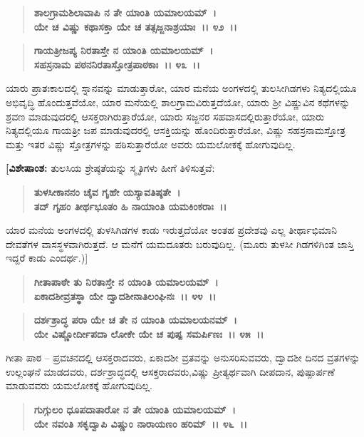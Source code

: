 \begin{verse}
\textbf{ಶಾಲಗ್ರಾಮಶಿಲಾವಾಪಿ ನ ತೇ ಯಾಂತಿ ಯಮಾಲಯಮ್~।}\\\textbf{ಯೇ ಚ ವಿಷ್ಣು ಕಥಾಸಕ್ತಾ ಯೇ ಚ ತತ್ಸಜ್ಜನಾಶ್ರಯಾಃ~।। ೪೨~।।}
\end{verse}

\begin{verse}
\textbf{ಗಾಯತ್ರೀಜಪ್ಯ ನಿರತಾಸ್ತೇ ನ ಯಾಂತಿ ಯಮಾಲಯಮ್~।}\\\textbf{ಸಹಸ್ರನಾಮ ಪಠನನಿರತಾಸ್ತೋತ್ರಪಾಠಕಾಃ~।। ೪೩~।।}
\end{verse}

ಯಾರು ಪ್ರಾತಃಕಾಲದಲ್ಲಿ ಸ್ನಾನವನ್ನು ಮಾಡುತ್ತಾರೋ, ಯಾರ ಮನೆಯ ಅಂಗಳದಲ್ಲಿ ತುಲಸೀಗಿಡಗಳು ನಿತ್ಯದಲ್ಲಿಯೂ ಅಭಿವೃದ್ಧಿ ಹೊಂದುತ್ತವೆಯೋ, ಯಾರ ಮನೆಯಲ್ಲಿ ಶಾಲಗ್ರಾಮವಿರುತ್ತದೆಯೋ, ಯಾರು ಶ‍್ರೀ ವಿಷ್ಣುವಿನ ಕಥೆಗಳನ್ನು ಶ್ರವಣ ಮಾಡುವುದರಲ್ಲಿ ಆಸಕ್ತರಾಗಿರುತ್ತಾರೆಯೋ, ಯಾರು ಸಜ್ಜನರ ಸಹವಾಸದಲ್ಲಿರುತ್ತಾರೆಯೋ, ಯಾರು ನಿತ್ಯದಲ್ಲಿಯೂ ಗಾಯತ್ರೀ ಜಪ ಮಾಡುವುದರಲ್ಲಿ ಆಸಕ್ತಿಯನ್ನು ಹೊಂದಿರುತ್ತಾರೆಯೋ, ವಿಷ್ಣು ಸಹಸ್ರನಾಮಸ್ತೋತ್ರ ಮತ್ತು ಇತರ ವಿಷ್ಣು ಸ್ತೋತ್ರಗಳನ್ನು ಪಠಿಸುತ್ತಾರೆಯೋ ಅವರು ಯಮಲೋಕಕ್ಕೆ ಹೋಗುವುದಿಲ್ಲ.

\textbf{[ವಿಶೇಷಾಂಶ:} ತುಲಸಿಯ ಶ್ರೇಷ್ಠತೆಯನ್ನು ಸ್ಮೃತಿಗಳು ಹೀಗೆ ತಿಳಿಸುತ್ತವೆ:

\begin{verse}
\textbf{ತುಳಸೀಕಾನನಂ ಚೈವ ಗೃಹೇ ಯಸ್ಯಾವತಿಷ್ಠತೇ~।}\\\textbf{ತದ್ ಗೃಹಂ ತೀರ್ಥಭೂತಂ ಹಿ ನಾಯಾಂತಿ ಯಮಕಿಂಕರಾಃ~।।}
\end{verse}

ಯಾರ ಮನೆಯ ಅಂಗಳದಲ್ಲಿ ತುಳಸಿಗಿಡಗಳ ಕಾಡು ಇರುತ್ತದೆಯೋ ಅಂತಹ ಪ್ರದೇಶವು ಎಲ್ಲ ತೀರ್ಥಾಭಿಮಾನಿ ದೇವತೆಗಳ ವಾಸಸ್ಥಳವಾಗಿರುತ್ತದೆ. ಆ ಮನೆಗೆ ಯಮದೂತರು ಬರುವುದಿಲ್ಲ. (ಮೂರು ತುಳಸೀ ಗಿಡಗಳಿಗಿಂತ ಜಾಸ್ತಿ ಇದ್ದರೆ ಕಾಡು ಎಂದರ್ಥ.)]

\begin{verse}
\textbf{ಗೀತಾಪಾಠೇ ತು ನಿರತಾಸ್ತೇ ನ ಯಾಂತಿ ಯಮಾಲಯಮ್~।}\\\textbf{ಏಕಾದಶೀವ್ರತಸ್ಥಾ ಯೇ ದ್ವಾದಶೀನಾತಿಲಂಘಿನಃ~।। ೪೪~।।} 
\end{verse}

\begin{verse}
\textbf{ದರ್ಶಶ್ರಾದ್ಧ ಪರಾ ಯೇ ಚ ತೇ ನ ಯಾಂತಿ ಯಮಾಲಯನಮ್~।}\\\textbf{ಯೇ ವಿಷ್ಣೋರ್ದೀಪದಾ ಲೋಕೇ ಯೇ ಚ ಪುಷ್ಪ ಸಮರ್ಪಿಣಃ~।। ೪೫~।। }
\end{verse}

ಗೀತಾ ಪಾಠ – ಪ್ರವಚನದಲ್ಲಿ ಆಸಕ್ತರಾದವರು, ಏಕಾದಶೀ ವ್ರತವನ್ನು ಅನುಸರಿಸುವವರು, ದ್ವಾದಶೀ ದಿನದ ವ್ರತಗಳನ್ನು ಉಲ್ಲಂಘನೆ ಮಾಡದವರು, ದರ್ಶಶ್ರಾದ್ಧದಲ್ಲಿ ಆಸಕ್ತ\break ರಾದವರು,ವಿಷ್ಣು ಪ್ರೀತ್ಯರ್ಥವಾಗಿ ದೀಪದಾನ, ಪುಷ್ಪಾರ್ಪಣೆ ಮಾಡುವವರು ಯಮಲೋಕಕ್ಕೆ ಹೋಗುವುದಿಲ್ಲ.

\begin{verse}
\textbf{ಗುಗ್ಗುಲಂ ಧೂಪದಾತಾರೋ ನ ತೇ ಯಾಂತಿ ಯಮಾಲಯಮ್~।}\\\textbf{ಯೇ ನವಂತಿ ಸಕೃದ್ವಾಪಿ ವಿಷ್ಣುಂ ನಾರಾಯಣಂ ಹರಿಮ್~।। ೪೬~।। }
\end{verse}

